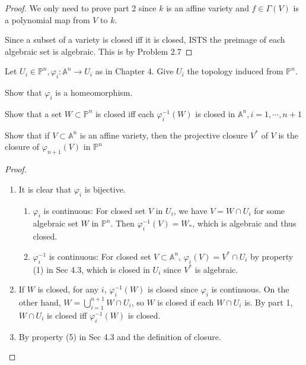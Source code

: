 \documentclass{solution}
\begin{document}
\begin{proof}
    We only need to prove part 2 since $k$ is an affine variety and $f \in \Gamma(V)$ is a polynomial map from $V$ to $k$.

    Since a subset of a variety is closed iff it is closed, ISTS the preimage of each algebraic set is algebraic. This is by Problem 2.7
\end{proof}

\begin{problem}{6.4}
    Let $U_i \in \mathbb{P}^n, \varphi_i: \mathbb{A}^n \rightarrow U_i$ as in Chapter 4. Give $U_i$ the topology induced from $\mathbb{P}^n$. \begin{inparaenum}
        \item Show that $\varphi_i$ is a homeomorphism.
        \item Show that a set $W \subset \mathbb{P}^n$ is closed iff each $\varphi^{-1}_i(W)$ is closed in $\mathbb{A}^n, i = 1, \cdots, n + 1$
        \item Show that if $V \subset \mathbb{A}^n$ is an affine variety, then the projective closure $V^*$ of $V$ is the closure of $\varphi_{n + 1}(V)$ in $\mathbb{P}^n$
    \end{inparaenum}
\end{problem}

\begin{proof}
    \begin{enumerate}
        \item It is clear that $\varphi_i$ is bijective.
        \begin{enumerate}
            \item $\varphi_i$ is continuous: For closed set $V$ in $U_i$, we have $V = W \cap U_i$ for some algebraic set $W$ in $\mathbb{P}^n$. Then $\varphi_i ^{-1}(V) = W_*$, which is algebraic and thus closed. 
            \item $\varphi_i ^{-1}$ is continuous: For closed set $V \subset \mathbb{A}^n$, $\varphi_i(V) = V^* \cap U_i$ by property (1) in Sec 4.3, which is closed in $U_i$ since $V^*$ is algebraic.
        \end{enumerate}
        \item If $W$ is closed, for any $i$, $\varphi_i ^{-1}(W)$ is closed since $\varphi_i$ is continuous. On the other hand, $W = \bigcup\limits_{i = 1}^{n + 1} W \cap U_i$, so $W$ is closed if each $W \cap U_i$ is. By part 1, $W \cap U_i$ is closed iff $\varphi_i ^{-1}(W)$ is closed.
        \item By property (5) in Sec 4.3 and the definition of closure.
    \end{enumerate}
\end{proof}
\end{document}

